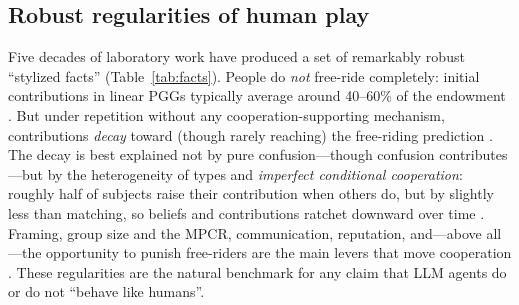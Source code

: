 \documentclass[11pt,a4paper]{article}
\begin{document}
\subsection{Robust regularities of human play}
\label{subsec:facts}

Five decades of laboratory work have produced a set of remarkably robust
``stylized facts'' (Table~\ref{tab:facts}). People do \emph{not} free-ride
completely: initial contributions in linear PGGs typically average around
40--60\% of the endowment \citep{ledyard1995public,zelmer2003linear}. But under
repetition without any cooperation-supporting mechanism, contributions
\emph{decay} toward (though rarely reaching) the free-riding prediction
\citep{isaac1988groupsize,andreoni1988free}. The decay is best explained not by
pure confusion---though confusion contributes \citep{andreoni1995kindness,
houser2002revisiting}---but by the heterogeneity of types and \emph{imperfect
conditional cooperation}: roughly half of subjects raise their contribution when
others do, but by slightly less than matching, so beliefs and contributions
ratchet downward over time \citep{fischbacher2001conditional,fischbacher2010social,
croson2007theories}. Framing, group size and the MPCR, communication, reputation,
and---above all---the opportunity to punish free-riders are the main levers that
move cooperation \citep{andreoni1995warmglow,isaac1994groupsize,
fehr2000cooperation,milinski2002reputation,chaudhuri2011sustaining}. These
regularities are the natural benchmark for any claim that LLM agents do or do not
``behave like humans''.
\end{document}
